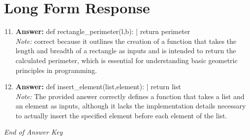 \documentclass[12pt]{article}
\begin{document}
\section*{Long Form Response}
\begin{enumerate}[label=\arabic*.]
\setcounter{enumi}{10}
\item \textbf{Answer:} def rectangle\_perimeter(l,b): | return perimeter
\\ \textit{Note:} correct because it outlines the creation of a function that takes the length and breadth of a rectangle as inputs and is intended to return the calculated perimeter, which is essential for understanding basic geometric principles in programming.
\item \textbf{Answer:} def insert\_element(list,element): | return list
\\ \textit{Note:} The provided answer correctly defines a function that takes a list and an element as inputs, although it lacks the implementation details necessary to actually insert the specified element before each element of the list.
\end{enumerate}

\vfill
\noindent\textit{End of Answer Key}
\end{document}
